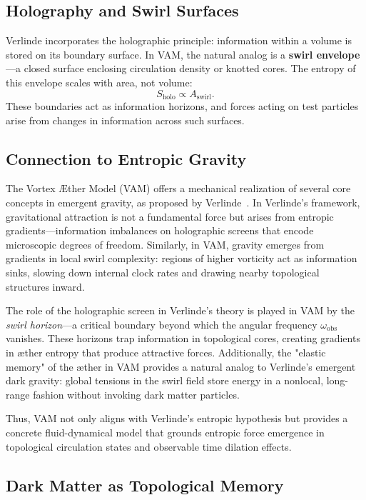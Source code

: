 \subsection*{Holography and Swirl Surfaces}

Verlinde incorporates the holographic principle: information within a volume is stored on its boundary surface. In VAM, the natural analog is a \textbf{swirl envelope}—a closed surface enclosing circulation density or knotted cores. The entropy of this envelope scales with area, not volume:
\begin{equation}
S_{\text{holo}} \propto A_{\text{swirl}}.
\end{equation}
These boundaries act as information horizons, and forces acting on test particles arise from changes in information across such surfaces.

\subsection*{Connection to Entropic Gravity}

The Vortex Æther Model (VAM) offers a mechanical realization of several core concepts in emergent gravity, as proposed by Verlinde~\cite{verlinde2017emergent}. In Verlinde's framework, gravitational attraction is not a fundamental force but arises from entropic gradients—information imbalances on holographic screens that encode microscopic degrees of freedom. Similarly, in VAM, gravity emerges from gradients in local swirl complexity: regions of higher vorticity act as information sinks, slowing down internal clock rates and drawing nearby topological structures inward.

The role of the holographic screen in Verlinde's theory is played in VAM by the \emph{swirl horizon}—a critical boundary beyond which the angular frequency $\omega_\text{obs}$ vanishes. These horizons trap information in topological cores, creating gradients in æther entropy that produce attractive forces. Additionally, the "elastic memory" of the æther in VAM provides a natural analog to Verlinde's emergent dark gravity: global tensions in the swirl field store energy in a nonlocal, long-range fashion without invoking dark matter particles.

Thus, VAM not only aligns with Verlinde's entropic hypothesis but provides a concrete fluid-dynamical model that grounds entropic force emergence in topological circulation states and observable time dilation effects.


\subsection*{Dark Matter as Topological Memory}

